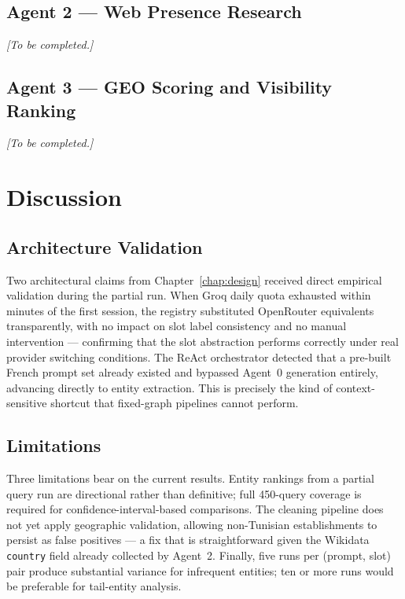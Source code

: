\subsection{Agent 2 — Web Presence Research}
\textit{[To be completed.]}

\subsection{Agent 3 — GEO Scoring and Visibility Ranking}
\textit{[To be completed.]}

\section{Discussion}
\label{sec:discussion}

\subsection{Architecture Validation}

Two architectural claims from Chapter~\ref{chap:design} received direct empirical
validation during the partial run. When Groq daily quota exhausted within minutes
of the first session, the registry substituted OpenRouter equivalents transparently,
with no impact on slot label consistency and no manual intervention — confirming
that the slot abstraction performs correctly under real provider switching conditions.
The ReAct orchestrator detected that a pre-built French prompt set already existed
and bypassed Agent~0 generation entirely, advancing directly to entity extraction.
This is precisely the kind of context-sensitive shortcut that fixed-graph pipelines
cannot perform.

\subsection{Limitations}

Three limitations bear on the current results.
Entity rankings from a partial query run are directional rather than definitive;
full 450-query coverage is required for confidence-interval-based comparisons.
The cleaning pipeline does not yet apply geographic validation, allowing
non-Tunisian establishments to persist as false positives — a fix that is
straightforward given the Wikidata \texttt{country} field already collected by
Agent~2.
Finally, five runs per (prompt, slot) pair produce substantial variance for
infrequent entities; ten or more runs would be preferable for tail-entity analysis.

